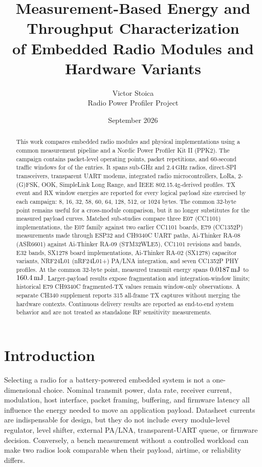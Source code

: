 \documentclass[10pt,a4paper]{article}
\title{Measurement-Based Energy and Throughput Characterization\\
of \TotalModules{} Embedded Radio Modules and Hardware Variants}
\author{Victor Stoica\\Radio Power Profiler Project}
\date{September 2026}
\newcommand{\SI}[2]{\ensuremath{#1\,\mathrm{#2}}}
\begin{document}
\maketitle

\begin{abstract}
This work compares \TotalModules{} embedded radio modules and physical implementations using a common measurement pipeline and a Nordic Power Profiler Kit II (PPK2). The campaign contains \TotalPacketPoints{} packet-level operating points, \TotalPacketRuns{} packet repetitions, and \TotalContinuousWindows{} 60-second traffic windows for \TotalContinuousModules{} of the entries. It spans sub-GHz and \SI{2.4}{GHz} radios, direct-SPI transceivers, transparent UART modems, integrated radio microcontrollers, LoRa, 2-(G)FSK, OOK, SimpleLink Long Range, and IEEE 802.15.4g-derived profiles. TX event and RX window energies are reported for every logical payload size exercised by each campaign: 8, 16, 32, 58, 60, 64, 128, 512, or 1024 bytes. The common 32-byte point remains useful for a cross-module comparison, but it no longer substitutes for the measured payload curves. Matched sub-studies compare three E07 (CC1101) implementations, the E07 family against two earlier CC1101 boards, E79 (CC1352P) measurements made through ESP32 and CH9340C UART paths, Ai-Thinker RA-08 (ASR6601) against Ai-Thinker RA-09 (STM32WLE5), CC1101 revisions and bands, E32 bands, SX1278 board implementations, Ai-Thinker RA-02 (SX1278) capacitor variants, NRF24L01 (nRF24L01+) PA/LNA integration, and seven CC1352P PHY profiles. At the common 32-byte point, measured transmit energy spans \SI{\BestPacketEnergy}{mJ} to \SI{\WorstPacketEnergy}{mJ}. Larger-payload results expose fragmentation and integration-window limits; historical E79 CH9340C fragmented-TX values remain window-only observations. A separate CH340 supplement reports 315 all-frame TX captures without merging the hardware contexts. Continuous delivery results are reported as end-to-end system behavior and are not treated as standalone RF sensitivity measurements.
\end{abstract}

\section{Introduction}

Selecting a radio for a battery-powered embedded system is not a one-dimensional choice. Nominal transmit power, data rate, receiver current, modulation, host interface, packet framing, buffering, and firmware latency all influence the energy needed to move an application payload. Datasheet currents are indispensable for design, but they do not include every module-level regulator, level shifter, external PA/LNA, transparent-UART queue, or firmware decision. Conversely, a bench measurement without a controlled workload can make two radios look comparable when their payload, airtime, or reliability differs.
\end{document}
